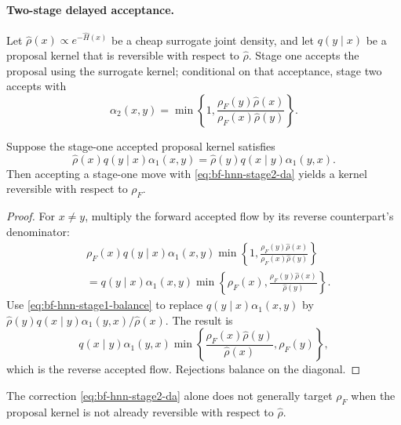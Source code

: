 \paragraph{Two-stage delayed acceptance.}
Let $\widehat\rho(x)\propto e^{-\widehat H(x)}$ be a cheap surrogate joint
density, and let $q(y\mid x)$ be a proposal kernel that is reversible with
respect to $\widehat\rho$.  Stage one accepts the proposal using the surrogate
kernel; conditional on that acceptance, stage two accepts with
\begin{equation}
 \alpha_2(x,y)=\min\left\{1,
 \frac{\rho_F(y)\widehat\rho(x)}
      {\rho_F(x)\widehat\rho(y)}\right\}.
 \label{eq:bf-hnn-stage2-da}
\end{equation}

\begin{proposition}
\label{prop:bf-hnn-da-balance}
Suppose the stage-one accepted proposal kernel satisfies
\begin{equation}
 \widehat\rho(x)q(y\mid x)\alpha_1(x,y)
 =\widehat\rho(y)q(x\mid y)\alpha_1(y,x).
 \label{eq:bf-hnn-stage1-balance}
\end{equation}
Then accepting a stage-one move with
\eqref{eq:bf-hnn-stage2-da} yields a kernel reversible with respect to
$\rho_F$.
\end{proposition}

\begin{proof}
For $x\ne y$, multiply the forward accepted flow by its reverse counterpart's
denominator:
\begin{align}
 &\rho_F(x)q(y\mid x)\alpha_1(x,y)
 \min\left\{1,
 \frac{\rho_F(y)\widehat\rho(x)}
      {\rho_F(x)\widehat\rho(y)}\right\}\\
 &=q(y\mid x)\alpha_1(x,y)
 \min\left\{\rho_F(x),
 \frac{\rho_F(y)\widehat\rho(x)}{\widehat\rho(y)}\right\}.
\end{align}
Use \eqref{eq:bf-hnn-stage1-balance} to replace
$q(y\mid x)\alpha_1(x,y)$ by
$\widehat\rho(y)q(x\mid y)\alpha_1(y,x)/\widehat\rho(x)$.  The result is
\begin{equation}
 q(x\mid y)\alpha_1(y,x)
 \min\left\{
 \frac{\rho_F(x)\widehat\rho(y)}{\widehat\rho(x)},
 \rho_F(y)\right\},
\end{equation}
which is the reverse accepted flow.  Rejections balance on the diagonal.
\end{proof}

\begin{proposition}
\label{prop:bf-hnn-missing-stage1}
The correction \eqref{eq:bf-hnn-stage2-da} alone does not generally target
$\rho_F$ when the proposal kernel is not already reversible with respect to
$\widehat\rho$.
\end{proposition}

